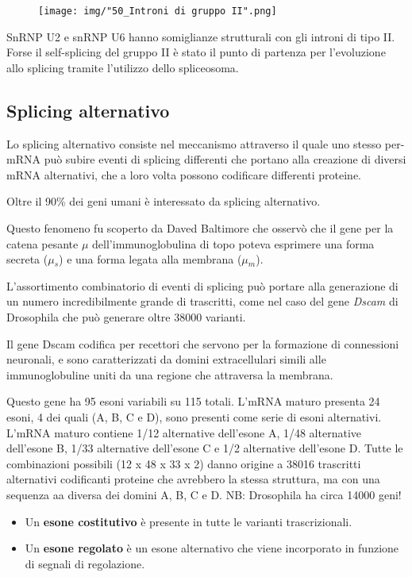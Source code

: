 \documentclass[11pt]{book}
\begin{document}
\begin{figure}[htp]
\centering
\texttt{[image: img/"50\_Introni di gruppo II".png]}
\caption{}
\label{introni-di-gruppo-ii}
\end{figure}

SnRNP U2 e snRNP U6 hanno somiglianze strutturali con gli introni di
tipo II. Forse il self-splicing del gruppo II è stato il punto di
partenza per l'evoluzione allo splicing tramite l'utilizzo dello
spliceosoma.

\subsection{Splicing alternativo}\label{splicing-alternativo}

Lo splicing alternativo consiste nel meccanismo attraverso il quale uno
stesso per-mRNA può subire eventi di splicing differenti che portano
alla creazione di diversi mRNA alternativi, che a loro volta possono
codificare differenti proteine.

Oltre il 90\% dei geni umani è interessato da splicing alternativo.

Questo fenomeno fu scoperto da Daved Baltimore che osservò che il gene
per la catena pesante \(\mu\) dell'immunoglobulina di topo poteva
esprimere una forma secreta (\(\mu\)\(_s\)) e una forma legata alla
membrana (\(\mu\)\(_m\)).

L'assortimento combinatorio di eventi di splicing può portare alla
generazione di un numero incredibilmente grande di trascritti, come nel
caso del gene \emph{Dscam} di Drosophila che può generare oltre 38000
varianti.

Il gene Dscam codifica per recettori che servono per la formazione di
connessioni neuronali, e sono caratterizzati da domini extracellulari
simili alle immunoglobuline uniti da una regione che attraversa la
membrana.

Questo gene ha 95 esoni variabili su 115 totali. L'mRNA maturo presenta
24 esoni, 4 dei quali (A, B, C e D), sono presenti come serie di esoni
alternativi. L'mRNA maturo contiene 1/12 alternative dell'esone A, 1/48
alternative dell'esone B, 1/33 alternative dell'esone C e 1/2
alternative dell'esone D. Tutte le combinazioni possibili (12 x 48 x 33
x 2) danno origine a 38016 trascritti alternativi codificanti proteine
che avrebbero la stessa struttura, ma con una sequenza aa diversa dei
domini A, B, C e D. NB: Drosophila ha circa 14000 geni!

\begin{itemize}
\item
  Un \textbf{esone costitutivo} è presente in tutte le varianti
  trascrizionali.
\item
  Un \textbf{esone regolato} è un esone alternativo che viene
  incorporato in funzione di segnali di regolazione.
\end{itemize}
\end{document}
